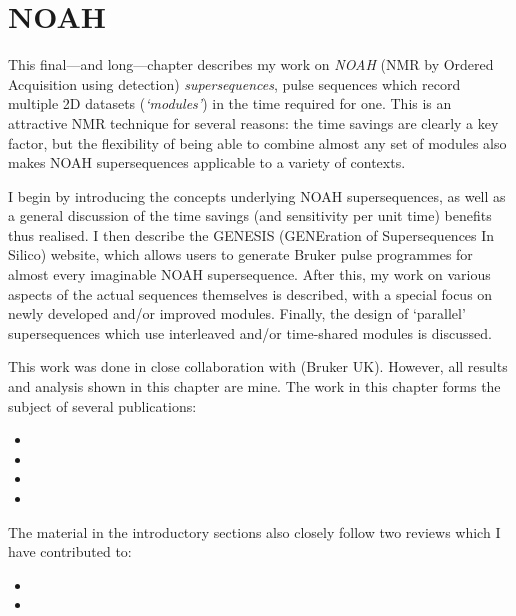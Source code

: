 \chapter{NOAH}
\label{chpt:noah}

This final---and long---chapter describes my work on \textit{NOAH} (NMR by Ordered Acquisition using \proton{} detection) \textit{supersequences}, pulse sequences which record multiple 2D datasets (\textit{`modules'}) in the time required for one.
This is an attractive NMR technique for several reasons: the time savings are clearly a key factor, but the flexibility of being able to combine almost any set of modules also makes NOAH supersequences applicable to a variety of contexts.

I begin by introducing the concepts underlying NOAH supersequences, as well as a general discussion of the time savings (and sensitivity per unit time) benefits thus realised.
I then describe the GENESIS (GENEration of Supersequences In Silico) website, which allows users to generate Bruker pulse programmes for almost every imaginable NOAH supersequence.
After this, my work on various aspects of the actual sequences themselves is described, with a special focus on newly developed and/or improved modules.
Finally, the design of `parallel' supersequences which use interleaved and/or time-shared modules is discussed.

This work was done in close collaboration with \EK{} (Bruker UK).
However, all results and analysis shown in this chapter are mine.
The work in this chapter forms the subject of several publications:

\begin{itemize}
    \item {}
    \item {}
    \item {}
    \item {}
\end{itemize}

The material in the introductory sections also closely follow two reviews which I have contributed to:
\begin{itemize}
    \item {}
    \item {}
\end{itemize}

\clearpage








\printbibliography[heading=subbibnumbered]{}
